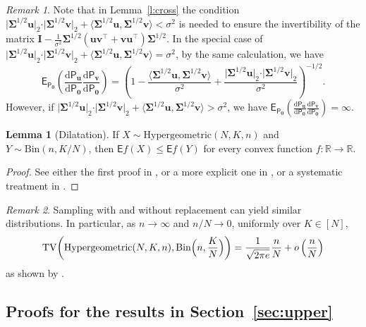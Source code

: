 \documentclass[11pt, a4paper]{article}
\newcommand{\mbf}{\mathbf}
\renewcommand{\l}{\left}
\renewcommand{\r}{\right}
\newcommand{\E}[0]{\mathsf{E}}
\newcommand{\p}{\mathsf{P}}
\newcommand{\R}{\mathbb{R}}
\theoremstyle{definition}
\theoremstyle{definition}
\theoremstyle{definition}
\newtheorem{lem}[thm]{Lemma}
\theoremstyle{definition}
\theoremstyle{definition}
\theoremstyle{remark}
\newtheorem{rem}{Remark}[section]
\theoremstyle{definition}
\theoremstyle{definition}
\theoremstyle{definition}
\begin{document}
\begin{rem}
Note that in Lemma~\ref{l:cross} the condition $\vert\bm\Sigma^{1/2}\bm u\vert_2 \cdot\vert\bm\Sigma^{1/2}\bm v\vert_2 + \langle \bm\Sigma^{1/2}\bm u, \bm\Sigma^{1/2}\bm v\rangle  < \sigma^{2}$ is needed to ensure the invertibility of the matrix $\mbf I - \frac{1}{\sigma^2}\bm\Sigma^{1/2}\l(\bm u \bm v^{\top} + \bm v \bm u^{\top}\r)\bm\Sigma^{1/2}$. In the special case of $\vert\bm\Sigma^{1/2}\bm u\vert_2 \cdot\vert\bm\Sigma^{1/2}\bm v\vert_2+\langle \bm\Sigma^{1/2}\bm u,\bm\Sigma^{1/2}\bm v\rangle = \sigma^2$, by the same calculation, we have 
\[
\E_{\p_{\bm 0}}\l(\frac{\mathrm{d}\p_{\bm u}}{\mathrm{d}\p_{\bm 0}}\frac{\mathrm{d}\p_{\bm v}}{\mathrm{d}\p_{\bm 0}}\r) = \l(1-\frac{\langle\bm\Sigma^{1/2}\bm u, \bm\Sigma^{1/2}\bm v\rangle}{\sigma^2} + \frac{\vert\bm\Sigma^{1/2}\bm u\vert_2 \cdot\vert\bm\Sigma^{1/2}\bm v\vert_2}{\sigma^2}\r)^{-1/2}.
\]
However, if $\vert\bm\Sigma^{1/2}\bm u\vert_2 \cdot\vert\bm\Sigma^{1/2}\bm v\vert_2+\langle \bm\Sigma^{1/2}\bm u,\bm\Sigma^{1/2}\bm v\rangle > \sigma^2$, we have $\E_{\p_{\bm 0}}\l(\tfrac{\mathrm{d}\p_{\bm u}}{\mathrm{d}\p_{\bm 0}}\tfrac{\mathrm{d}\p_{\bm v}}{\mathrm{d}\p_{\bm 0}}\r) = \infty$.
\end{rem}

\begin{lem}[Dilatation]\label{l:dila}
If $X \sim \mathrm{Hypergeometric}(N, K, n)$ and $Y \sim \mathrm{Bin}(n, K/N)$, then $\E{f(X)}\le\E{f(Y)}$ for every convex function $f:\R \to \R$. 
\end{lem}

\begin{proof}
See either the first proof in \citet[Theorem~4 on pages 21--23]{Hoe63}, or a more explicit one in \citet[Proposition~(20.6) on pages 171--172]{Ald85}, or a systematic treatment in \citet[Section~3]{Kem73}. 
\end{proof}

\begin{rem}
Sampling with and without replacement can yield similar distributions. In particular, as $n \to \infty$ and $n/N \to 0$,  uniformly over $K \in [N]$,  
\[
\mathrm{TV} \biggl(\mathrm{Hypergeometric}(N, K, n),  \mathrm{Bin}\Bigl(n, \frac{K}{N}\Bigr)\biggr) = \frac{1}{\sqrt{2\pi e}}\frac{n}{N} + o\l(\frac{n}{N}\r)
\]
as shown by \citet[Theorem~1.6]{DiFr88}.
\end{rem}

\subsection{Proofs for the results in Section~\ref{sec:upper}}
\end{document}
